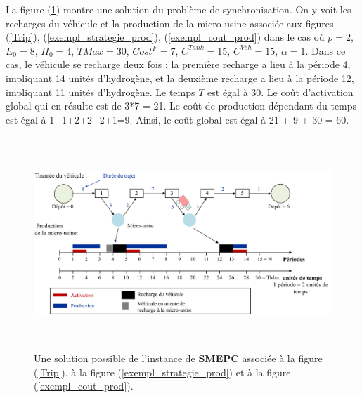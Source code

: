 \begin{Example}
	\label{exemple_synchronisation}
	La figure (\ref{synchronisation}) montre une solution du problème de synchronisation. On y voit les recharges du véhicule et la production de la micro-usine associée aux figures (\ref{Trip}), (\ref{exempl_strategie_prod}), (\ref{exempl_cout_prod}) dans le cas où $p=2$, $E_0=8$, $H_0=4$, $TMax=30$, $Cost^F=7$, $C^{Tank}=15$, $C^{Veh}=15$, $\alpha=1$. Dans ce cas, le véhicule se recharge deux fois : la première recharge a lieu à la période 4, impliquant 14 unités d'hydrogène, et la deuxième recharge a lieu à la période 12, impliquant 11 unités d'hydrogène. Le temps $T$ est égal à 30. Le coût d'activation global qui en résulte est de 3*7 = 21. Le coût de production dépendant du temps est égal à 1+1+2+2+2+1=9. Ainsi, le coût global est égal à 21 + 9 + 30 = 60. 
	\begin{figure}[H]
		\centerline{
			\includegraphics[height=8cm]{images_these/synchronisation.pdf}}
		\caption[Une solution possible d'une instance de SMEPC]{Une solution possible de l'instance de \textbf{SMEPC} associée à la figure (\ref{Trip}), à la figure (\ref{exempl_strategie_prod}) et à la figure (\ref{exempl_cout_prod}). }
		\label{synchronisation}
	\end{figure}
	
	
\end{Example}

